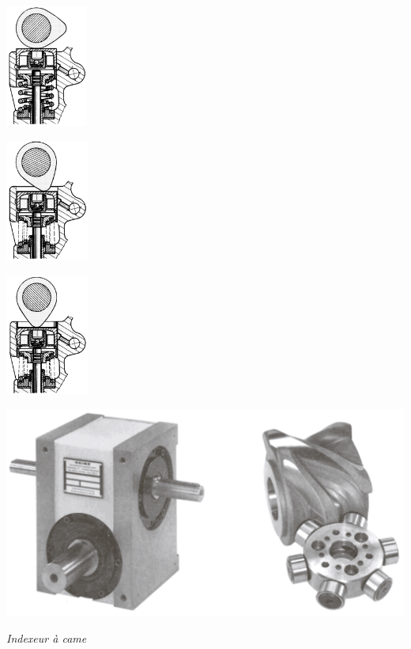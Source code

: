 \documentclass[11pt,oneside]{article}
\begin{document}
\begin{minipage}[c]{.3\linewidth}
\begin{center}
\includegraphics[height=4cm]{png/fig_118}
\end{center}
\end{minipage}\hfill
\begin{minipage}[c]{.3\linewidth}
\begin{center}
\includegraphics[height=4cm]{png/fig_119}
\end{center}
\end{minipage}\hfill
\begin{minipage}[c]{.3\linewidth}
\begin{center}
\includegraphics[height=4cm]{png/fig_120}
\end{center}
\end{minipage}


\begin{center}
\includegraphics[width=.8\textwidth]{png/fig_121}

\textit{Indexeur à came}
\end{center}
\end{document}
